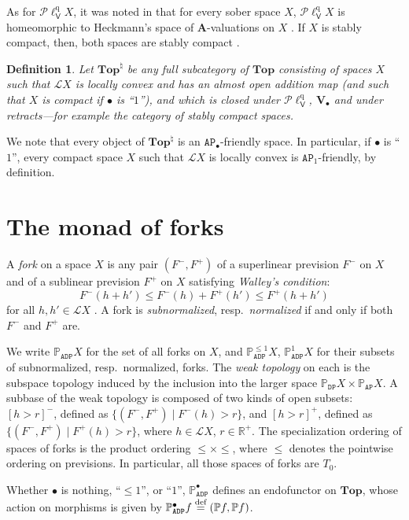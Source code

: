 \documentclass[preprint,12pt]{elsarticle}
\newcommand\eqdef{\mathrel{\buildrel \text{def}\over=}}
\newcommand{\real}{\mathbb{R}}
\newcommand\Lform{\mathcal L}
\newcommand\Pred{\mathbb{P}}
\newcommand\Angel{{\mathtt{A}}}
\newcommand\Demon{{\mathtt{D}}}
\newcommand\Nature{{\mathtt{P}}}
\newcommand\AN{{\Angel\Nature}}
\newcommand\DN{{\Demon\Nature}}
\newcommand\ADN{{\Angel\Demon\Nature}}
\newcommand\Vt{\mathsf{V}}
\newcommand\quasi{\mathrm{q}} %
\newcommand\QL{\Plotkin^\quasi}
\newcommand\QLV{\QL_\Vt}
\newcommand\Plotkin{\mathcal P\ell} %
\newcommand\Val{{\mathbf V}}
\newcommand\Topcat{\mathbf{Top}}
\newtheorem{definition}[theorem]{Definition}
\begin{document}
As for $\QLV X$, it was noted in \cite[Fact~5.2]{GL:duality} that for
every sober space $X$, $\QLV X$ is homeomorphic to Heckmann's space of
$\mathbf A$-valuations on $X$ \cite{heckmann96}.  If $X$ is stably
compact, then, both spaces are stably compact
\cite[Proposition~5.13]{GL:duality}.
\begin{definition}
  \label{defn:Top:nat}
  Let $\Topcat^\natural$ be any full subcategory of $\Topcat$
  consisting of spaces $X$ such that $\Lform X$ is locally convex and
  has an almost open addition map (and such that $X$ is compact if
  $\bullet$ is ``$1$''), and which is closed under $\QLV$,
  $\Val_\bullet$ and under retracts---for example the category of
  stably compact spaces.
\end{definition}
We note that every object of $\Topcat^\natural$ is an
$\AN_\bullet$-friendly space.  In particular, if $\bullet$ is ``$1$'',
every compact space $X$ such that $\Lform X$ is locally convex is
$\AN_1$-friendly, by definition.


\section{The monad of forks}
\label{sec:monad-forks}

A \emph{fork} on a space $X$ is any pair
$(F^-, F^+)$ of a superlinear prevision $F^-$ on $X$ and of a
sublinear prevision $F^+$ on $X$ satisfying \emph{Walley's condition}:
\[
  F^- (h+h') \leq F^- (h) + F^+ (h') \leq F^+ (h+h')
\]
for all $h, h' \in \Lform X$ \cite{Gou-csl07,KP:predtrans:pow}.  A
fork is \emph{subnormalized}, resp.\ \emph{normalized} if and only if
both $F^-$ and $F^+$ are.

We write $\Pred_{\ADN} X$ for the set of all forks on $X$, and
$\Pred^{\leq 1}_{\ADN} X$, $\Pred^1_{\ADN} X$ for their subsets of
subnormalized, resp.\ normalized, forks.  The \emph{weak topology} on
each is the subspace topology induced by the inclusion into the larger
space $\Pred_{\DN} X \times \Pred_{\AN} X$.  A subbase of the weak
topology is composed of two kinds of open subsets: $[h > r]^-$,
defined as $\{(F^-, F^+) \mid F^- (h) > r\}$, and $[h > r]^+$, defined
as $\{(F^-, F^+) \mid F^+ (h) > r\}$, where $h \in \Lform X$,
$r \in \real^+$.  The specialization ordering of spaces of forks is
the product ordering $\leq \times \leq$, where $\leq$ denotes the
pointwise ordering on previsions.  In particular, all those spaces of
forks are $T_0$.

Whether $\bullet$ is nothing, ``$\leq 1$'', or
``$1$'', $\Pred_\ADN^\bullet$ defines an endofunctor on $\Topcat$,
whose action on morphisms is given by
$\Pred_\ADN^\bullet f \eqdef (\Pred f, \Pred f)$.
\end{document}
